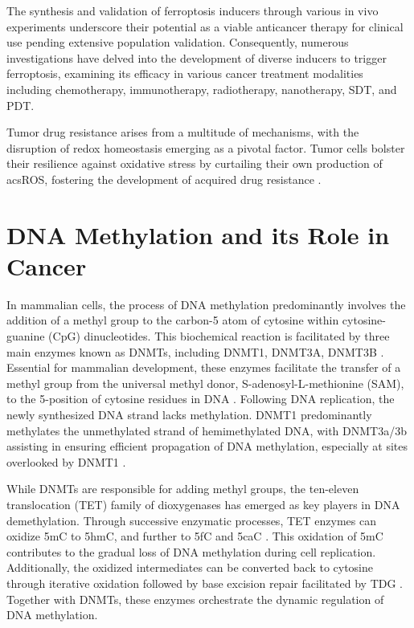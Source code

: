The synthesis and validation of ferroptosis inducers through various in vivo experiments underscore their potential as a viable anticancer therapy for clinical use pending extensive population validation. Consequently, numerous investigations have delved into the development of diverse inducers to trigger ferroptosis, examining its efficacy in various cancer treatment modalities including chemotherapy, immunotherapy, radiotherapy, nanotherapy, SDT, and PDT.

Tumor drug resistance arises from a multitude of mechanisms, with the disruption of redox homeostasis emerging as a pivotal factor. Tumor cells bolster their resilience against oxidative stress by curtailing their own production of acs{ROS}, fostering the development of acquired drug resistance \citep{ferro_res}.

\section{DNA Methylation and its Role in Cancer}

In mammalian cells, the process of DNA methylation predominantly involves the addition of a methyl group to the carbon-5 atom of cytosine within cytosine-guanine (CpG) dinucleotides. This biochemical reaction is facilitated by three main enzymes known as \acp{DNMT}, including DNMT1, DNMT3A, DNMT3B \citep{dnmt_enzymes}. Essential for mammalian development, these enzymes facilitate the transfer of a methyl group from the universal methyl donor, S-adenosyl-L-methionine (SAM), to the 5-position of cytosine residues in DNA \citep{dnmt}. Following DNA replication, the newly synthesized DNA strand lacks methylation. DNMT1 predominantly methylates the unmethylated strand of hemimethylated DNA, with DNMT3a/3b assisting in ensuring efficient propagation of DNA methylation, especially at sites overlooked by DNMT1 \citep{dnmt_enzymes}.

While DNMTs are responsible for adding methyl groups, the ten-eleven translocation (TET) family of dioxygenases has emerged as key players in DNA demethylation. Through successive enzymatic processes, TET enzymes can oxidize \ac{5mC} to \ac{5hmC}, and further to \ac{5fC} and \ac{5caC} \citep{tet}. This oxidation of \acs{5mC} contributes to the gradual loss of DNA methylation during cell replication. Additionally, the oxidized intermediates can be converted back to cytosine through iterative oxidation followed by base excision repair facilitated by \ac{TDG} \citep{demeth}. Together with DNMTs, these enzymes orchestrate the dynamic regulation of DNA methylation.

